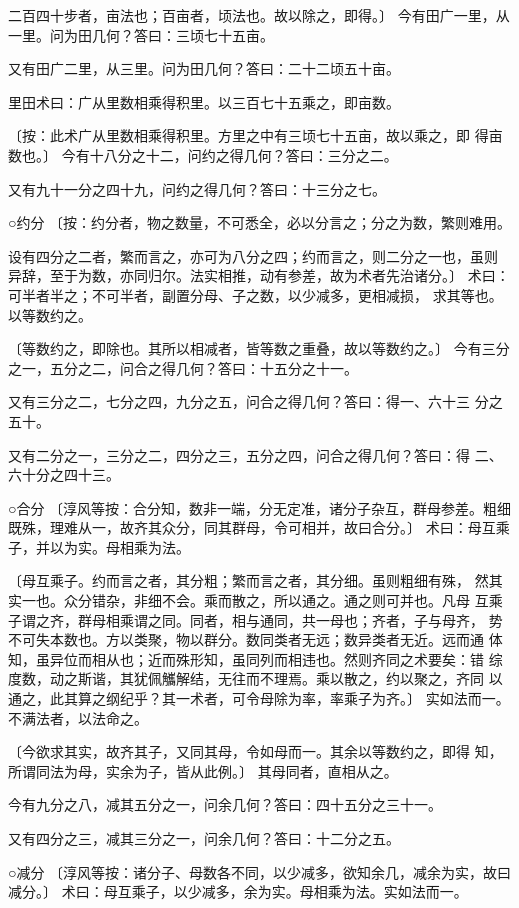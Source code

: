 \documentclass[a4paper,12pt,UTF8,twoside]{ctexbook}
\begin{document}
二百四十步者，亩法也；百亩者，顷法也。故以除之，即得。〕 今有田广一里，从一里。问为田几何？答曰：三顷七十五亩。

又有田广二里，从三里。问为田几何？答曰：二十二顷五十亩。

里田术曰：广从里数相乘得积里。以三百七十五乘之，即亩数。

〔按：此术广从里数相乘得积里。方里之中有三顷七十五亩，故以乘之，即 得亩数也。〕 今有十八分之十二，问约之得几何？答曰：三分之二。

又有九十一分之四十九，问约之得几何？答曰：十三分之七。

○约分 〔按：约分者，物之数量，不可悉全，必以分言之；分之为数，繁则难用。

设有四分之二者，繁而言之，亦可为八分之四；约而言之，则二分之一也，虽则 异辞，至于为数，亦同归尔。法实相推，动有参差，故为术者先治诸分。〕 术曰：可半者半之；不可半者，副置分母、子之数，以少减多，更相减损， 求其等也。以等数约之。

〔等数约之，即除也。其所以相减者，皆等数之重叠，故以等数约之。〕 今有三分之一，五分之二，问合之得几何？答曰：十五分之十一。

又有三分之二，七分之四，九分之五，问合之得几何？答曰：得一、六十三 分之五十。

又有二分之一，三分之二，四分之三，五分之四，问合之得几何？答曰：得 二、六十分之四十三。

○合分 〔淳风等按：合分知，数非一端，分无定准，诸分子杂互，群母参差。粗细 既殊，理难从一，故齐其众分，同其群母，令可相并，故曰合分。〕 术曰：母互乘子，并以为实。母相乘为法。

〔母互乘子。约而言之者，其分粗；繁而言之者，其分细。虽则粗细有殊， 然其实一也。众分错杂，非细不会。乘而散之，所以通之。通之则可并也。凡母 互乘子谓之齐，群母相乘谓之同。同者，相与通同，共一母也；齐者，子与母齐， 势不可失本数也。方以类聚，物以群分。数同类者无远；数异类者无近。远而通 体知，虽异位而相从也；近而殊形知，虽同列而相违也。然则齐同之术要矣：错 综度数，动之斯谐，其犹佩觿解结，无往而不理焉。乘以散之，约以聚之，齐同 以通之，此其算之纲纪乎？其一术者，可令母除为率，率乘子为齐。〕 实如法而一。不满法者，以法命之。

〔今欲求其实，故齐其子，又同其母，令如母而一。其余以等数约之，即得 知，所谓同法为母，实余为子，皆从此例。〕 其母同者，直相从之。

今有九分之八，减其五分之一，问余几何？答曰：四十五分之三十一。

又有四分之三，减其三分之一，问余几何？答曰：十二分之五。

○减分 〔淳风等按：诸分子、母数各不同，以少减多，欲知余几，减余为实，故曰 减分。〕 术曰：母互乘子，以少减多，余为实。母相乘为法。实如法而一。
\end{document}
